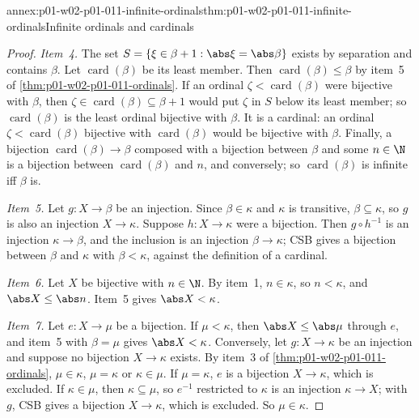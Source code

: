 \begin{annexitem}{annex:p01-w02-p01-011-infinite-ordinals}{thm:p01-w02-p01-011-infinite-ordinals}{Infinite ordinals and cardinals}
\begin{proof}
\emph{Item~4.} The set \(S=\{\xi\in\beta+1:\abs\xi=\abs\beta\}\) exists by
separation and contains \(\beta\). Let \(\operatorname{card}(\beta)\) be its least member.
Then \(\operatorname{card}(\beta)\leq\beta\) by item~5 of
\cref{thm:p01-w02-p01-011-ordinals}. If an ordinal \(\zeta<\operatorname{card}(\beta)\) were
bijective with \(\beta\), then \(\zeta\in \operatorname{card}(\beta)\subseteq\beta+1\) would
put \(\zeta\) in \(S\) below its least member; so \(\operatorname{card}(\beta)\) is the least
ordinal bijective with \(\beta\). It is a cardinal: an ordinal
\(\zeta<\operatorname{card}(\beta)\) bijective with \(\operatorname{card}(\beta)\) would be bijective with
\(\beta\). Finally, a bijection \(\operatorname{card}(\beta)\to\beta\) composed with a
bijection between \(\beta\) and some \(n\in\N\) is a bijection between
\(\operatorname{card}(\beta)\) and \(n\), and conversely; so \(\operatorname{card}(\beta)\) is infinite iff
\(\beta\) is.

\emph{Item~5.} Let \(g:X\to\beta\) be an injection. Since \(\beta\in\kappa\)
and \(\kappa\) is transitive, \(\beta\subseteq\kappa\), so \(g\) is also an
injection \(X\to\kappa\). Suppose \(h:X\to\kappa\) were a bijection. Then
\(g\circ h^{-1}\) is an injection \(\kappa\to\beta\), and the inclusion is
an injection \(\beta\to\kappa\); CSB gives a bijection between \(\beta\) and
\(\kappa\) with \(\beta<\kappa\), against the definition of a cardinal.

\emph{Item~6.} Let \(X\) be bijective with \(n\in\N\). By item~1,
\(n\in\kappa\), so \(n<\kappa\), and \(\abs X\leq\abs n\). Item~5 gives
\(\abs X<\kappa\).

\emph{Item~7.} Let \(e:X\to\mu\) be a bijection. If \(\mu<\kappa\), then
\(\abs X\leq\abs\mu\) through \(e\), and item~5 with \(\beta=\mu\) gives
\(\abs X<\kappa\). Conversely, let \(g:X\to\kappa\) be an injection and
suppose no bijection \(X\to\kappa\) exists. By item~3 of
\cref{thm:p01-w02-p01-011-ordinals}, \(\mu\in\kappa\), \(\mu=\kappa\) or
\(\kappa\in\mu\). If \(\mu=\kappa\), \(e\) is a bijection \(X\to\kappa\),
which is excluded. If \(\kappa\in\mu\), then \(\kappa\subseteq\mu\), so
\(e^{-1}\) restricted to \(\kappa\) is an injection \(\kappa\to X\); with
\(g\), CSB gives a bijection \(X\to\kappa\), which is excluded. So
\(\mu\in\kappa\).
\end{proof}
\end{annexitem}

